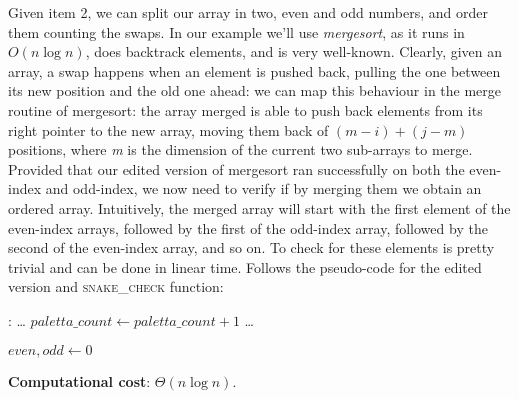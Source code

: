 \documentclass{article}
\begin{document}
Given item 2, we can split our array in two, even and odd numbers, and order
them counting the swaps.
In our example we'll use \emph{mergesort}, as it runs in $O(n\log n)$, does
backtrack elements, and is very well-known.
Clearly, given an array, a swap happens when an element is pushed back, pulling
the one between its new position and the old one ahead: we can map this behaviour
in the merge routine of mergesort: the array merged is able to push back elements
from its right pointer to the new array, moving them back of $(m - i) + (j - m)$ positions,
where \emph{m} is the dimension of the current two sub-arrays to merge.
Provided that our edited version of mergesort ran successfully on both the
even-index and odd-index, we now need to verify if by merging them we obtain an
ordered array.
Intuitively, the merged array will start with the first element of the even-index
arrays, followed by the first of the odd-index array, followed by the second of
the even-index array, and so on.
To check for these elements is pretty trivial and can be done in linear time.
Follows the pseudo-code for the edited version and \textsc{snake\_check} function:

\begin{algorithmic}[1]
  :
    \State \dots                        {}
      \State $paletta\_count \gets paletta\_count + 1$
      \State \dots
      \EndIf
    \EndFunction
\end{algorithmic}

\begin{algorithmic}[1]
    \State $even, odd \gets 0$
        \State {}\;
      \EndIf
    \EndFor
    \State {}\;
    \EndFunction
\end{algorithmic}

\begin{framed}
  \noindent
  \textbf{Computational cost}: $\Theta(n\log n)$.
\end{framed}
\end{document}
